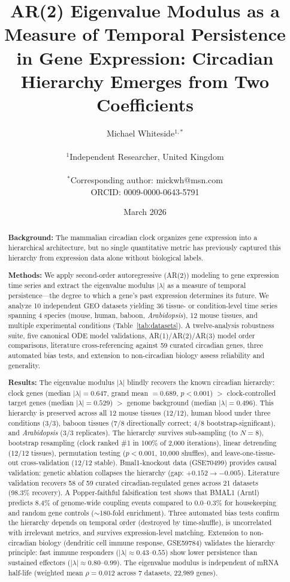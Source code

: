\documentclass[11pt,letterpaper]{article}
\title{\textbf{AR(2) Eigenvalue Modulus as a Measure of Temporal Persistence in Gene Expression: Circadian Hierarchy Emerges from Two Coefficients}}
\author{
Michael Whiteside$^{1,*}$ \\
\\
$^1$Independent Researcher, United Kingdom \\
\\
$^*$Corresponding author: mickwh@msn.com \\
ORCID: 0009-0000-0643-5791
}
\date{March 2026}
\begin{document}
\maketitle

\begin{abstract}
\noindent\textbf{Background:} The mammalian circadian clock organizes gene expression into a hierarchical architecture, but no single quantitative metric has previously captured this hierarchy from expression data alone without biological labels.

\noindent\textbf{Methods:} We apply second-order autoregressive (AR(2)) modeling to gene expression time series and extract the eigenvalue modulus $|\lambda|$ as a measure of temporal persistence---the degree to which a gene's past expression determines its future. We analyze 10 independent GEO datasets yielding 36 tissue- or condition-level time series spanning 4 species (mouse, human, baboon, \textit{Arabidopsis}), 12 mouse tissues, and multiple experimental conditions (Table~\ref{tab:datasets}). A twelve-analysis robustness suite, five canonical ODE model validations, AR(1)/AR(2)/AR(3) model order comparisons, literature cross-referencing against 59 curated circadian genes, three automated bias tests, and extension to non-circadian biology assess reliability and generality.

\noindent\textbf{Results:} The eigenvalue modulus $|\lambda|$ blindly recovers the known circadian hierarchy: clock genes (median $|\lambda| = 0.647$, grand mean $= 0.689$, $p < 0.001$) $>$ clock-controlled target genes (median $|\lambda| = 0.529$) $>$ genome background (median $|\lambda| = 0.496$). This hierarchy is preserved across all 12 mouse tissues (12/12), human blood under three conditions (3/3), baboon tissues (7/8 directionally correct; 4/8 bootstrap-significant), and \textit{Arabidopsis} (3/3 replicates). The hierarchy survives sub-sampling (to $N=8$), bootstrap resampling (clock ranked \#1 in 100\% of 2,000 iterations), linear detrending (12/12 tissues), permutation testing ($p < 0.001$, 10,000 shuffles), and leave-one-tissue-out cross-validation (12/12 stable). Bmal1-knockout data (GSE70499) provides causal validation: genetic ablation collapses the hierarchy (gap: $+0.152 \rightarrow -0.005$). Literature validation recovers 58 of 59 curated circadian-regulated genes across 21 datasets (98.3\% recovery). A Popper-faithful falsification test shows that BMAL1 (Arntl) predicts 8.4\% of genome-wide coupling events compared to 0.0--0.3\% for housekeeping and random gene controls ($\sim$180-fold enrichment). Three automated bias tests confirm the hierarchy depends on temporal order (destroyed by time-shuffle), is uncorrelated with irrelevant metrics, and survives expression-level matching. Extension to non-circadian biology (dendritic cell immune response, GSE59784) validates the hierarchy principle: fast immune responders ($|\lambda| \approx 0.43$--$0.55$) show lower persistence than sustained effectors ($|\lambda| \approx 0.80$--$0.99$). The eigenvalue modulus is independent of mRNA half-life (weighted mean $\rho = 0.012$ across 7 datasets, 22,989 genes).


\end{abstract}
\end{document}
